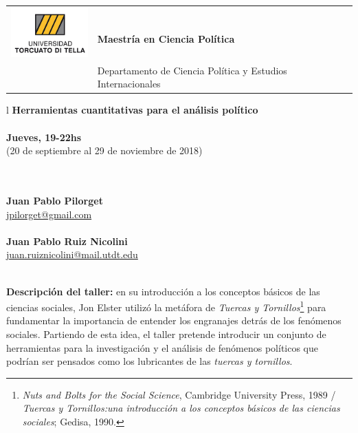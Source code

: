\documentclass[11pt]{article}
\begin{document}
\begin{tabular}{ l l }
  \multirow{2}{*}{\includegraphics[height=.75in,width=1.2in]{utdt.png}}  
  \\
 & \textbf{\large Maestría en Ciencia Política} 
  \\ 
  & Departamento de Ciencia Política y Estudios Internacionales
  
\end{tabular}
\vspace{20mm}

\begin{tabular}{l}
\textbf{\LARGE Herramientas cuantitativas para el análisis político}
 \\
  \\

\large\textbf{Jueves, 19-22hs}
 \\

\large{(20 de septiembre al 29 de noviembre de 2018)}
 
  \\
  \\
 \large \textbf{Juan Pablo Pilorget}
 \\
 \large \href{mailto:jpilorget@gmail.com}{jpilorget@gmail.com}
 \\
  \\
 \large \textbf{Juan Pablo Ruiz Nicolini}
 \\
 \large \href{mailto:juan.ruiznicolini@mail.utdt.edu}{juan.ruiznicolini@mail.utdt.edu}
\end{tabular}


\vspace{2cm}

\textbf {\large \\ Descripción del taller:} en su introducción a los conceptos básicos de las ciencias sociales, Jon Elster utilizó la metáfora de \textit{Tuercas y Tornillos}\footnote{\textit{Nuts and Bolts for the Social Science}, Cambridge University Press, 1989 / \textit{Tuercas y Tornillos:una introducción a los conceptos básicos de las ciencias sociales}; Gedisa, 1990.} para fundamentar la importancia de entender los engranajes detrás de los fenómenos sociales. Partiendo de esta idea, el taller pretende introducir un conjunto de  herramientas para la investigación y el análisis de fenómenos políticos que podrían ser pensados como los lubricantes de las \textit{tuercas y tornillos}. 
\end{document}
